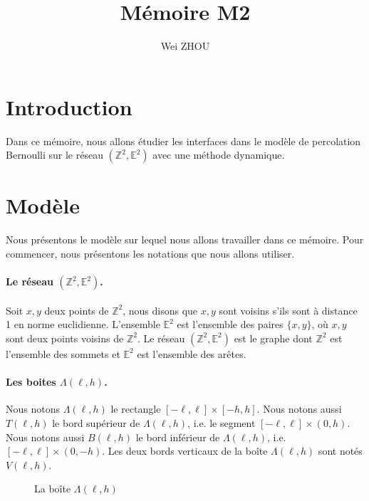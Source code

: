 \documentclass[titlepage,a4paper,12pt]{article}
\title{Mémoire M2}
\author{Wei ZHOU}
\begin{document}
\maketitle

\section{Introduction}
Dans ce mémoire, nous allons étudier les interfaces dans le modèle de percolation Bernoulli sur le réseau $(\mathbb{Z}^2,\mathbb{E}^2)$ avec une méthode dynamique.

\section{Modèle}
Nous présentons le modèle sur lequel nous allons travailler dans ce mémoire. Pour commencer, nous présentons les notations que nous allons utiliser.

\paragraph{Le réseau $(\mathbb{Z}^2,\mathbb{E}^2)$.} Soit $x,y$ deux points de $\mathbb{Z}^2$, nous disons que $x,y$ sont voisins s'ils sont à distance 1 en norme euclidienne. L'ensemble $\mathbb{E}^2$ est l'ensemble des paires $\{x,y\}$, où $x,y$ sont deux points voisins de $\mathbb{Z}^2$. Le réseau $(\mathbb{Z}^2, \mathbb{E}^2)$ est le graphe dont $\mathbb{Z}^2$ est l'ensemble des sommets et $\mathbb{E}^2$ est l'ensemble des arêtes.

\paragraph{Les boites $\Lambda(\ell,h)$.} Nous notons $\Lambda(\ell,h)$ le rectangle $[-\ell,\ell]\times[-h,h]$. Nous notons aussi $T(\ell,h)$ le bord supérieur de $\Lambda(\ell,h)$, i.e. le segment $[-\ell,\ell]\times(0,h)$. Nous notons aussi $B(\ell,h)$ le bord inférieur de $\Lambda(\ell,h)$, i.e. $[-\ell,\ell]\times(0,-h)$. Les deux bords verticaux de la boîte $\Lambda(\ell,h)$ sont notés $V(\ell,h)$.
\begin{figure}[h]
\center
{}
\caption{La boîte $\Lambda(\ell,h)$}
\end{figure}
\end{document}
